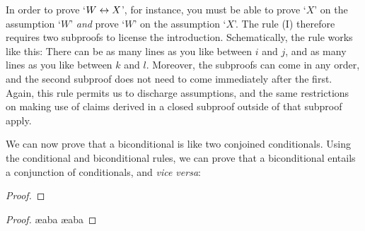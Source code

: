In order to prove `$W \leftrightarrow X$', for instance, you must be able to prove `$X$' on the assumption `$W$' \emph{and} prove `$W$' on the assumption `$X$'. The  rule ({\eiff}I) therefore requires two subproofs to license the introduction. Schematically, the rule works like this:
There can be as many lines as you like between $i$ and $j$, and as many lines as you like between $k$ and $l$. Moreover, the subproofs can come in any order, and the second subproof does not need to come immediately after the first. Again, this rule permits us to discharge assumptions, and the same restrictions on making use of claims derived in a closed subproof outside of that subproof apply.

We can now prove that a biconditional is like two conjoined conditionals. Using the conditional and biconditional rules, we can prove that a biconditional entails a conjunction of conditionals, and \emph{vice versa}: 

\begin{multicols}{2}\noindent
	 \begin{proof}
	\open {}
	\open {}
	\close
	\open
	\close
\end{proof}
	\begin{proof}
		\ae{aba}
		\open {}
		\close
		\ae{aba}
		\open {}
		\close
	\end{proof}
\end{multicols}

